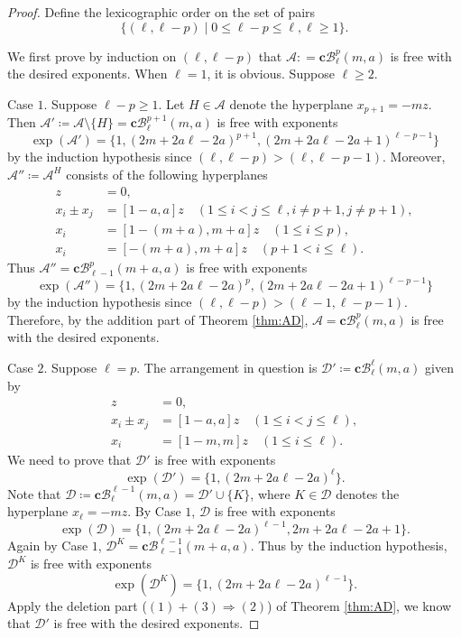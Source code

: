 \documentclass[11pt]{article}
\theoremstyle{definition}
\numberwithin{equation}{section}
\newcommand{\A}{\mathcal{A}}
\newcommand{\B}{\mathcal{B}}
\newcommand{\D}{\mathcal{D}}
\begin{document}
 \begin{proof}
Define the lexicographic order on the set of pairs
$$\{ (\ell, \ell-p) \mid 0\le \ell- p \le \ell, \ell \ge 1\}.$$

We first prove by induction on $ (\ell, \ell-p) $ that $\A: = \textbf{c}\B^p_\ell(m, a)$ is free with the desired exponents. 
When $\ell=1$, it is obvious. Suppose $\ell\ge2$.

Case $1$. Suppose $\ell-p\ge 1$. 
Let $H \in \A$ denote the hyperplane $x_{p+1} = -mz$. 
Then $\A' \coloneqq \A\setminus \{H\} = \textbf{c}\B^{p+1}_\ell(m,a)$ is free  with exponents 
$$\exp(\A') = \{1, (2m+2a\ell-2a)^{p+1}, (2m+2a\ell-2a+1)^{\ell-p-1}\}$$ 
by the induction hypothesis since $(\ell, \ell-p) > (\ell, \ell-p-1)$. 
Moreover, $\A'' \coloneqq \A^{H}$ consists of the following hyperplanes 
\begin{align*}
z &= 0 , \\
x_{i}\pm x_{j} &=  [1-a , a]z\quad  (1 \leq i < j \leq \ell, i\ne p+1,j\ne p+1 ), \\
x_i&=  [1-(m+a) , m+a]z \quad (1 \leq   i \leq p), \\
x_i&=[-(m+a) , m+a] z \quad (p+1<  i \leq \ell).
\end{align*}
Thus $\A'' =   \textbf{c}\B^{p}_{\ell-1}(m+a, a) $ is free with exponents 
$$\exp(\A'') = \{1, (2m+2a\ell-2a)^{p}, (2m+2a\ell-2a+1)^{\ell-p-1}\}$$ 
by the induction hypothesis since $(\ell, \ell-p) > (\ell-1, \ell-p-1)$. 
Therefore, by the addition part of Theorem \ref{thm:AD}, $\A =\textbf{c}\B^p_\ell(m, a)$ is free with the desired exponents. 

Case $2$. Suppose  $\ell=p$. 
The arrangement  in question is $\D'  \coloneqq \textbf{c}\B^\ell_\ell(m,a)$ given by
\begin{align*}
z &= 0 , \\
x_{i}\pm x_{j} &=  [1-a , a]z\quad  (1 \leq i < j \leq \ell), \\
x_i&=  [1-m , m]z \quad (1 \leq   i \leq \ell).
\end{align*}
We need to prove   that $\D'$ is free with exponents 
$$\exp(\D') = \{1, (2m+2a\ell-2a)^{\ell}\}.$$ 
Note that $\D  \coloneqq \textbf{c}\B^{\ell-1}_\ell(m,a) = \D' \cup \{K\}$, where $K  \in \D$ denotes the hyperplane $x_\ell = -mz$. 
By Case $1$, $\D$ is free with exponents 
$$\exp(\D) = \{1, (2m+2a\ell-2a)^{\ell-1}, 2m+2a\ell-2a+1\}.$$
Again by Case $1$, $\D^K= \textbf{c}\B^{\ell-1}_{\ell-1}(m+a, a)$.
Thus by the induction hypothesis, $\D^K$ is free with exponents 
$$\exp(\D^K) = \{1, (2m+2a\ell-2a)^{\ell-1}\}.$$ 
Apply the deletion part ($(1)+(3) \Rightarrow (2)$) of Theorem \ref{thm:AD}, we know that  
$\D'$ is free with the desired exponents. 


\end{proof}
\end{document}
